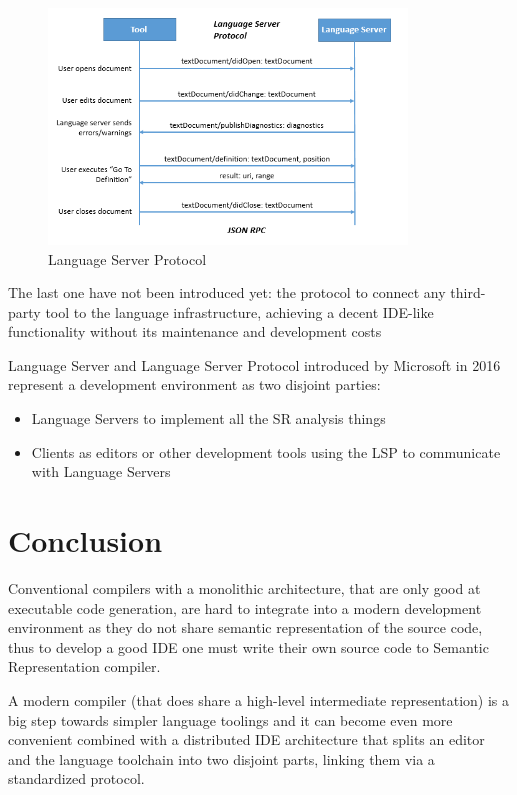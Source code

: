 \begin{figure}[H]
    \centering
    \includegraphics[width=0.85\textwidth]{figs/lsp.png}
    \caption{Language Server Protocol}
\end{figure}

The last one have not been introduced yet: the protocol to connect any
third-party tool to the language infrastructure, achieving a decent IDE-like
functionality without its maintenance and development costs

Language Server and Language Server Protocol introduced by Microsoft in 2016
represent a development environment as two disjoint parties:
\begin{itemize}
    \item Language Servers to implement all the SR analysis things
    \item Clients as editors or other development tools using the LSP to communicate with Language Servers \cite{Sourcegraph}
\end{itemize}

\section{Conclusion}
\label{sec:review_conclusion}

Conventional compilers with a monolithic architecture, that are only good at executable code generation,
are hard to integrate into a modern development environment as they do not share
semantic representation of the source code, thus to develop a good IDE one must write their own
source code to Semantic Representation compiler.

A modern compiler (that does share a high-level intermediate representation) is
a big step towards simpler language toolings and it can become even more convenient
combined with a distributed IDE architecture that splits an editor and the language toolchain
into two disjoint parts, linking them via a standardized protocol.

